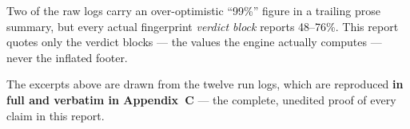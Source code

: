 \begin{keypoint}
Two of the raw logs carry an over-optimistic ``99\%'' figure in a trailing prose summary,
but every actual fingerprint \emph{verdict block} reports 48--76\%. This report quotes only
the verdict blocks — the values the engine actually computes — never the inflated footer.
\end{keypoint}

\noindent The excerpts above are drawn from the twelve run logs, which are reproduced
\textbf{in full and verbatim in Appendix~C} — the complete, unedited proof of every claim in
this report.
